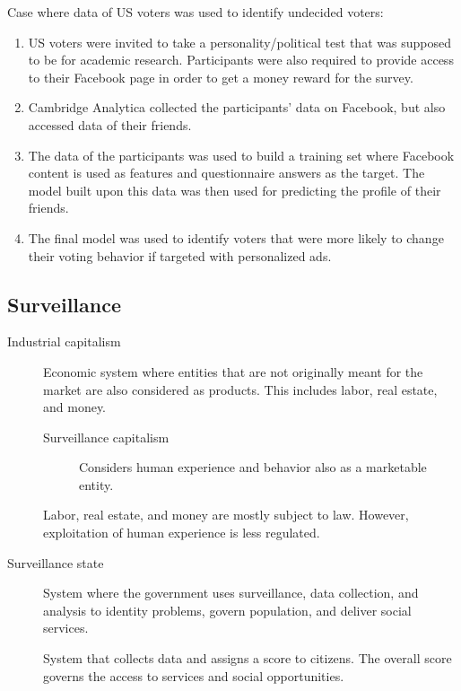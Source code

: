 \begin{example}
    Case where data of US voters was used to identify undecided voters:
    \begin{enumerate}
        \item US voters were invited to take a personality/political test that was supposed to be for academic research. Participants were also required to provide access to their Facebook page in order to get a money reward for the survey.
        \item Cambridge Analytica collected the participants' data on Facebook, but also accessed data of their friends.
        \item The data of the participants was used to build a training set where Facebook content is used as features and questionnaire answers as the target. The model built upon this data was then used for predicting the profile of their friends.
        \item The final model was used to identify voters that were more likely to change their voting behavior if targeted with personalized ads.
    \end{enumerate}
\end{example}


\subsection{Surveillance}

\begin{description}
    \item[Industrial capitalism] 
        Economic system where entities that are not originally meant for the market are also considered as products. This includes labor, real estate, and money.

        \begin{description}
            \item[Surveillance capitalism] 
                Considers human experience and behavior also as a marketable entity.
        \end{description}

        \begin{remark}
            Labor, real estate, and money are mostly subject to law. However, exploitation of human experience is less regulated.
        \end{remark}

    \item[Surveillance state] 
        System where the government uses surveillance, data collection, and analysis to identity problems, govern population, and deliver social services.

        \begin{example}
            System that collects data and assigns a score to citizens. The overall score governs the access to services and social opportunities.
        \end{example}
\end{description}


